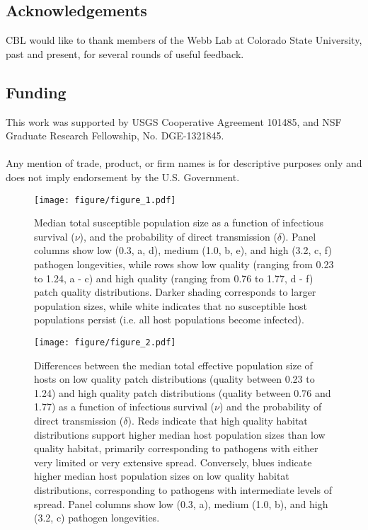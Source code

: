 \documentclass{article}
\begin{document}
\subsection*{Acknowledgements}

CBL would like to thank members of the Webb Lab at Colorado State University, past and present, for several rounds of useful feedback.  

\subsection*{Funding}

This work was supported by USGS Cooperative Agreement 101485, and NSF Graduate Research Fellowship, No. DGE-1321845.
\\
\\
Any mention of trade, product, or firm names is for descriptive purposes only and does not imply endorsement by the U.S. Government.

\clearpage

     

\clearpage

\begin{figure}
\texttt{[image: figure/figure\_1.pdf]}
\caption{Median total susceptible population size as a function of infectious survival ($\nu$), and the probability of direct transmission ($\delta$).  Panel columns show low (0.3, a, d), medium (1.0, b, e), and high (3.2, c, f) pathogen longevities, while rows show low quality (ranging from 0.23 to 1.24, a - c) and high quality (ranging from 0.76 to 1.77, d - f) patch quality distributions.  Darker shading corresponds to larger population sizes, while white indicates that no susceptible host populations persist (i.e. all host populations become infected).}
\label{endemic}
\end{figure}

\begin{figure}
\texttt{[image: figure/figure\_2.pdf]}
\centering
\caption{Differences between the median total effective population size of hosts on low quality patch distributions (quality between 0.23 to 1.24) and high quality patch distributions (quality between 0.76 and 1.77) as a function of infectious survival ($\nu$) and the probability of direct transmission ($\delta$).  Reds indicate that high quality habitat distributions support higher median host population sizes than low quality habitat, primarily corresponding to pathogens with either very limited or very extensive spread. Conversely, blues indicate higher median host population sizes on low quality habitat distributions, corresponding to pathogens with intermediate levels of spread.  Panel columns show low (0.3, a), medium (1.0, b), and high (3.2, c) pathogen longevities.}
\label{highvlow}
\end{figure}
\end{document}
